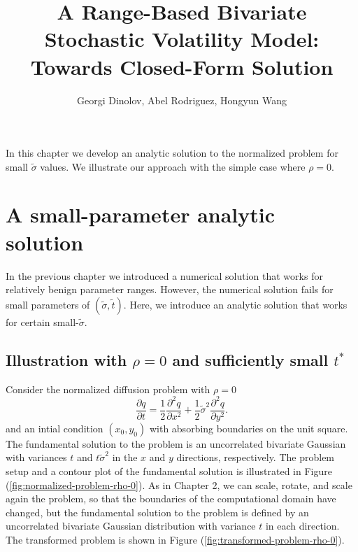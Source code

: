 \documentclass[10pt]{article}
\title{A Range-Based Bivariate Stochastic Volatility Model: Towards Closed-Form Solution}
\author{Georgi Dinolov, Abel Rodriguez, Hongyun Wang}
\date{} %
\begin{document}
\def\spacingset#1{\renewcommand{\baselinestretch}%
{#1}\small\normalsize} \spacingset{1}

\bigskip

\vspace{1cm}

In this chapter we develop an analytic solution to the normalized
problem for small $\tilde{\sigma}$ values. We illustrate our approach
with the simple case where $\rho=0$.

\section{A small-parameter analytic solution}
In the previous chapter we introduced a numerical solution that works
for relatively benign parameter ranges. However, the numerical
solution fails for small parameters of $(\tilde{\sigma},
\tilde{t})$. Here, we introduce an analytic solution that works for
certain small-$\tilde{\sigma}$.

\subsection{Illustration with $\rho=0$ and sufficiently small
  $t^{*}$}
Consider the normalized diffusion problem with $\rho=0$
\[
  \frac{\partial q}{\partial t} = \frac{1}{2}\frac{\partial^2 q}{\partial x^2} + \frac{1}{2}\tilde{\sigma}^2 \frac{\partial^2 q}{\partial y^2}.
\]
and an intial condition $(x_0, y_0)$ with absorbing boundaries on the
unit square. The fundamental solution to the problem is an
uncorrelated bivariate Gaussian with variances $t$ and
$t\tilde{\sigma}^2$ in the $x$ and $y$ directions, respectively. The
problem setup and a contour plot of the fundamental solution is
illustrated in Figure (\ref{fig:normalized-problem-rho-0}). As in
Chapter 2, we can scale, rotate, and scale again the problem, so that
the boundaries of the computational domain have changed, but the
fundamental solution to the problem is defined by an uncorrelated
bivariate Gaussian distribution with variance $t$ in each
direction. The transformed problem is shown in Figure
(\ref{fig:transformed-problem-rho-0}).
\end{document}
